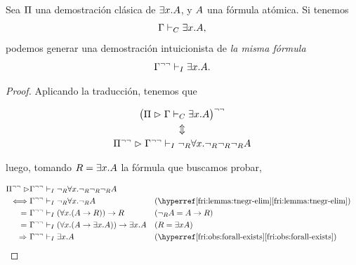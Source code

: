 \begin{theorem}
    \label{fri:thm:fri-sigmaone}

    Sea $\Pi$ una demostración clásica de $\exists x . A$, y
    $A$ una fórmula atómica.
    Si tenemos
    \[
        \Gamma \vdash_C \exists x . A,
    \]
    podemos generar una demostración intuicionista de \textit{la misma fórmula}
    \[
        \Gamma^{\neg\neg} \vdash_I \exists x . A.
    \]
\end{theorem}
\begin{proof}

    Aplicando la traducción, tenemos que

    \begin{gather*}
        \big(
            \Pi \vartriangleright \Gamma \vdash_C \exists x . A
            \big)^{\neg\neg}\\
        \Updownarrow\\
        \Pi^{\neg\neg} \vartriangleright \Gamma^{\neg\neg} \vdash_I \neg_R \forall x . \neg_R \neg_R \neg_R A
    \end{gather*}

    luego, tomando $R = \exists x . A$ la fórmula que buscamos probar,

    \begin{align*}
        \transDNeg{\someProof} \proves & \transDNeg{\ctx} \judgI \fNotR \forall \var . \fNotR \fNotR \fNotR \form                                                                                                                  \\
        \iff                           & \transDNeg{\ctx} \judgI \fNotR \forall \var . \fNotR \form
                                       &                                                                                                                    & (\text{\namedref{fri:lemma:tnegr-elim}})                             \\
        =\                             & \transDNeg{\ctx} \judgI (\forall \var . (\form \rightarrow R)) \rightarrow R
                                       &                                                                                                                    & (\fNotR \form = \form \fImp R)                                       \\
        =\                             & \transDNeg{\ctx} \judgI (\forall \var . (\form \rightarrow \exists \var . \form)) \rightarrow \exists \var . \form &                                           & (R = \exists \var \form) \\
        \Rightarrow\                   & \transDNeg{\ctx} \judgI \exists \var . \form
                                       &                                                                                                                    & (\text{\namedref{fri:obs:forall-exists}})
    \end{align*}


\end{proof}
